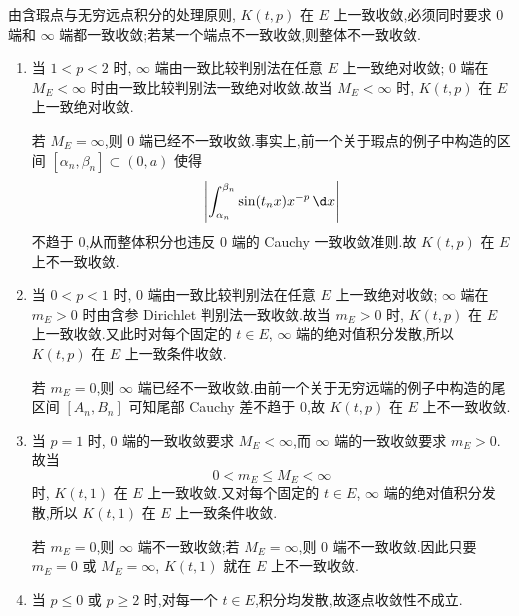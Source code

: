 \begin{example}
\begin{enumerate}
		由含瑕点与无穷远点积分的处理原则, $K(t,p)$ 在 $E$ 上一致收敛,必须同时要求 $0$ 端和 $\infty$ 端都一致收敛;若某一个端点不一致收敛,则整体不一致收敛.

		\begin{enumerate}
			\item 当 $1<p<2$ 时, $\infty$ 端由一致比较判别法在任意 $E$ 上一致绝对收敛; $0$ 端在 $M_E<\infty$ 时由一致比较判别法一致绝对收敛.故当 $M_E<\infty$ 时, $K(t,p)$ 在 $E$ 上一致绝对收敛.

			若 $M_E=\infty$,则 $0$ 端已经不一致收敛.事实上,前一个关于瑕点的例子中构造的区间 $[\alpha_n,\beta_n]\subset(0,a)$ 使得
			\begin{equation*}
				\left|\int_{\alpha_n}^{\beta_n}\sin(t_nx)x^{-p}\,\d x\right|
			\end{equation*}
			不趋于 $0$,从而整体积分也违反 $0$ 端的 Cauchy 一致收敛准则.故 $K(t,p)$ 在 $E$ 上不一致收敛.

			\item 当 $0<p<1$ 时, $0$ 端由一致比较判别法在任意 $E$ 上一致绝对收敛; $\infty$ 端在 $m_E>0$ 时由含参 Dirichlet 判别法一致收敛.故当 $m_E>0$ 时, $K(t,p)$ 在 $E$ 上一致收敛.又此时对每个固定的 $t\in E$, $\infty$ 端的绝对值积分发散,所以 $K(t,p)$ 在 $E$ 上一致条件收敛.

			若 $m_E=0$,则 $\infty$ 端已经不一致收敛.由前一个关于无穷远端的例子中构造的尾区间 $[A_n,B_n]$ 可知尾部 Cauchy 差不趋于 $0$,故 $K(t,p)$ 在 $E$ 上不一致收敛.

			\item 当 $p=1$ 时, $0$ 端的一致收敛要求 $M_E<\infty$,而 $\infty$ 端的一致收敛要求 $m_E>0$.故当
			\begin{equation*}
				0<m_E\leq M_E<\infty
			\end{equation*}
			时, $K(t,1)$ 在 $E$ 上一致收敛.又对每个固定的 $t\in E$, $\infty$ 端的绝对值积分发散,所以 $K(t,1)$ 在 $E$ 上一致条件收敛.

			若 $m_E=0$,则 $\infty$ 端不一致收敛;若 $M_E=\infty$,则 $0$ 端不一致收敛.因此只要 $m_E=0$ 或 $M_E=\infty$, $K(t,1)$ 就在 $E$ 上不一致收敛.

			\item 当 $p\leq0$ 或 $p\geq2$ 时,对每一个 $t\in E$,积分均发散,故逐点收敛性不成立.
		\end{enumerate}


\end{enumerate}
\end{example}
